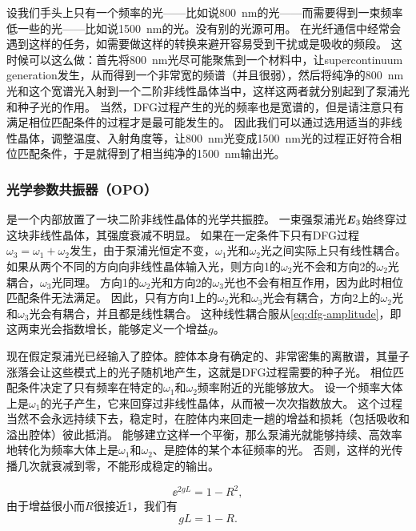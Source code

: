 设我们手头上只有一个频率的光——比如说\SI{800}{nm}的光——而需要得到一束频率低一些的光——比如说\SI{1500}{nm}的光。没有别的光源可用。
在光纤通信中经常会遇到这样的任务，如需要做这样的转换来避开容易受到干扰或是吸收的频段。
这时候可以这么做：首先将\SI{800}{nm}光尽可能聚焦到一个材料中，让supercontinuum generation发生，从而得到一个非常宽的频谱（并且很弱），然后将纯净的\SI{800}{nm}光和这个宽谱光入射到一个二阶非线性晶体当中，这样这两者就分别起到了泵浦光和种子光的作用。
当然，DFG过程产生的光的频率也是宽谱的，但是请注意只有满足相位匹配条件的过程才是最可能发生的。
因此我们可以通过选用适当的非线性晶体，调整温度、入射角度等，让\SI{800}{nm}光变成\SI{1500}{nm}光的过程正好符合相位匹配条件，于是就得到了相当纯净的\SI{1500}{nm}输出光。

\subsubsection{光学参数共振器（OPO）}

是一个内部放置了一块二阶非线性晶体的光学共振腔。
一束强泵浦光$\vb*{E}_3$始终穿过这块非线性晶体，其强度衰减不明显。
如果在一定条件下只有DFG过程$\omega_3 = \omega_1 + \omega_2$发生，由于泵浦光恒定不变，$\omega_1$光和$\omega_2$光之间实际上只有线性耦合。
如果从两个不同的方向向非线性晶体输入光，则方向1的$\omega_2$光不会和方向2的$\omega_2$光耦合，$\omega_3$光同理。
方向1的$\omega_2$光和方向2的$\omega_3$光也不会有相互作用，因为此时相位匹配条件无法满足。
因此，只有方向1上的$\omega_2$光和$\omega_3$光会有耦合，方向2上的$\omega_2$光和$\omega_3$光会有耦合，并且都是线性耦合。
这种线性耦合服从\eqref{eq:dfg-amplitude}，即这两束光会指数增长，能够定义一个增益$g$。

现在假定泵浦光已经输入了腔体。腔体本身有确定的、非常密集的离散谱，其量子涨落会让这些模式上的光子随机地产生，这就是DFG过程需要的种子光。
相位匹配条件决定了只有频率在特定的$\omega_1$和$\omega_2$频率附近的光能够放大。
设一个频率大体上是$\omega_1$的光子产生，它来回穿过非线性晶体，从而被一次次指数放大。
这个过程当然不会永远持续下去，稳定时，在腔体内来回走一趟的增益和损耗（包括吸收和溢出腔体）彼此抵消。
能够建立这样一个平衡，那么泵浦光就能够持续、高效率地转化为频率大体上是$\omega_1$和$\omega_2$、是腔体的某个本征频率的光。
否则，这样的光传播几次就衰减到零，不能形成稳定的输出。

\begin{equation}
    \ee^{2 g L} = 1 - R^2,
\end{equation}
由于增益很小而$R$很接近1，我们有
\begin{equation}
    g L = 1 - R.
\end{equation}

